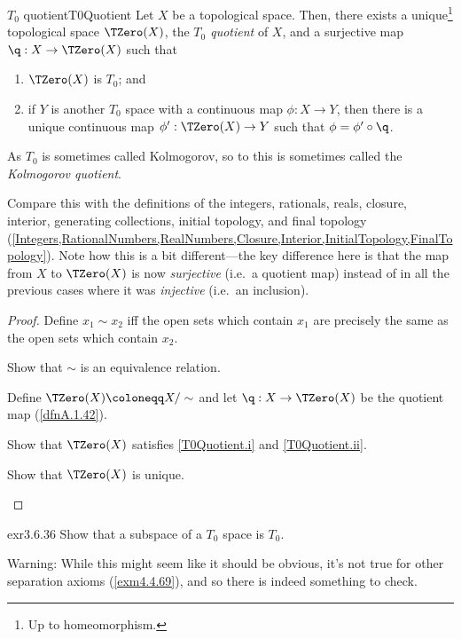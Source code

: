 \begin{prp}{$T_0$ quotient}{T0Quotient}
Let $X$ be a topological space.  Then, there exists a unique\footnote{Up to homeomorphism.} topological space $\TZero (X)$, the \emph{$T_0$ quotient} of $X$, and a surjective map $\q :X\rightarrow \TZero (X)$ such that
\begin{enumerate}
\item \label{T0Quotient.i}$\TZero (X)$ is $T_0$; and
\item \label{T0Quotient.ii}if $Y$ is another $T_0$ space with a continuous map $\phi :X\rightarrow Y$, then there is a unique continuous map $\phi ':\TZero (X)\rightarrow Y$ such that $\phi =\phi '\circ \q$.
\end{enumerate}
\begin{rmk}
As $T_0$ is sometimes called Kolmogorov, so to this is sometimes called the \emph{Kolmogorov quotient}.
\end{rmk}
\begin{rmk}
Compare this with the definitions of the integers, rationals, reals, closure, interior, generating collections, initial topology, and final topology (\cref{Integers,RationalNumbers,RealNumbers,Closure,Interior,InitialTopology,FinalTopology}).  Note how this is a bit different---the key difference here is that the map from $X$ to $\TZero (X)$ is now \emph{surjective} (i.e.~a quotient map) instead of in all the previous cases where it was \emph{injective} (i.e.~an inclusion).
\end{rmk}
\begin{proof}
Define $x_1\sim x_2$ iff the open sets which contain $x_1$ are precisely the same as the open sets which contain $x_2$.
\begin{exr}[breakable=false]{}{}
Show that $\sim$ is an equivalence relation.
\end{exr}
Define $\TZero (X)\coloneqq X/\sim$ and let $\q :X\rightarrow \TZero (X)$ be the quotient map (\cref{dfnA.1.42}).
\begin{exr}[breakable=false]{}{}
Show that $\TZero (X)$ satisfies \cref{T0Quotient.i} and \cref{T0Quotient.ii}.
\end{exr}
\begin{exr}[breakable=false]{}{}
Show that $\TZero (X)$ is unique.
\end{exr}
\end{proof}
\end{prp}
\begin{exr}{}{exr3.6.36}
Show that a subspace of a $T_0$ space is $T_0$.
\begin{wrn}
Warning:  While this might seem like it should be obvious, it's not true for other separation axioms (\cref{exm4.4.69}), and so there is indeed something to check.
\end{wrn}
\end{exr}
